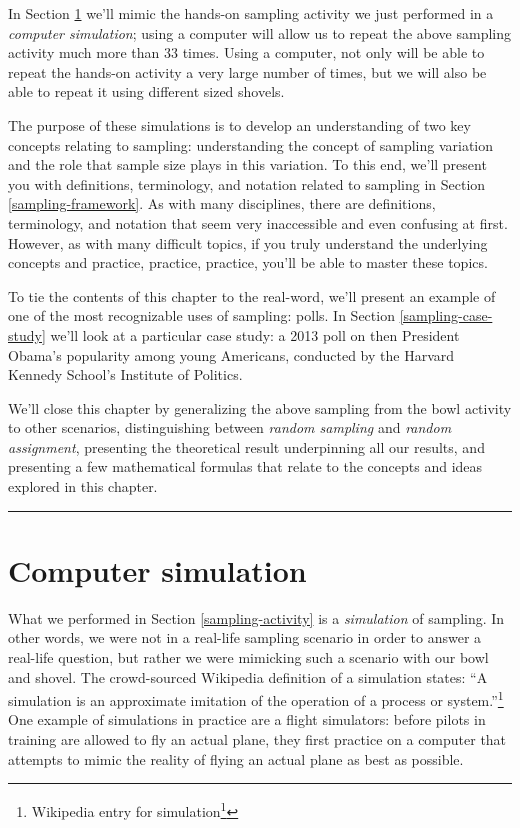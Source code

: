 \documentclass[12pt, krantz2,]{krantz}
\renewcommand{\href}[2]{#2\footnote{\url{#1}}}
\begin{document}
In Section \ref{sampling-simulation} we'll mimic the hands-on sampling activity we just performed in a \emph{computer simulation}; using a computer will allow us to repeat the above sampling activity much more than 33 times. Using a computer, not only will be able to repeat the hands-on activity a very large number of times, but we will also be able to repeat it using different sized shovels.

The purpose of these simulations is to develop an understanding of two key concepts relating to sampling: understanding the concept of sampling variation and the role that sample size plays in this variation. To this end, we'll present you with definitions, terminology, and notation related to sampling in Section \ref{sampling-framework}. As with many disciplines, there are definitions, terminology, and notation that seem very inaccessible and even confusing at first. However, as with many difficult topics, if you truly understand the underlying concepts and practice, practice, practice, you'll be able to master these topics.

To tie the contents of this chapter to the real-word, we'll present an example of one of the most recognizable uses of sampling: polls. In Section \ref{sampling-case-study} we'll look at a particular case study: a 2013 poll on then President Obama's popularity among young Americans, conducted by the Harvard Kennedy School's Institute of Politics.

We'll close this chapter by generalizing the above sampling from the bowl activity to other scenarios, distinguishing between \emph{random sampling} and \emph{random assignment}, presenting the theoretical result underpinning all our results, and presenting a few mathematical formulas that relate to the concepts and ideas explored in this chapter.

\begin{center}\rule{0.5\linewidth}{\linethickness}\end{center}

\hypertarget{sampling-simulation}{%
\section{Computer simulation}\label{sampling-simulation}}

What we performed in Section \ref{sampling-activity} is a \emph{simulation} of sampling. In other words, we were not in a real-life sampling scenario in order to answer a real-life question, but rather we were mimicking such a scenario with our bowl and shovel. The crowd-sourced Wikipedia definition of a simulation states: ``A simulation is an approximate imitation of the operation of a process or system.''\footnote{\href{https://en.wikipedia.org/wiki/Simulation}{Wikipedia entry for simulation}} One example of simulations in practice are a flight simulators: before pilots in training are allowed to fly an actual plane, they first practice on a computer that attempts to mimic the reality of flying an actual plane as best as possible.
\end{document}
